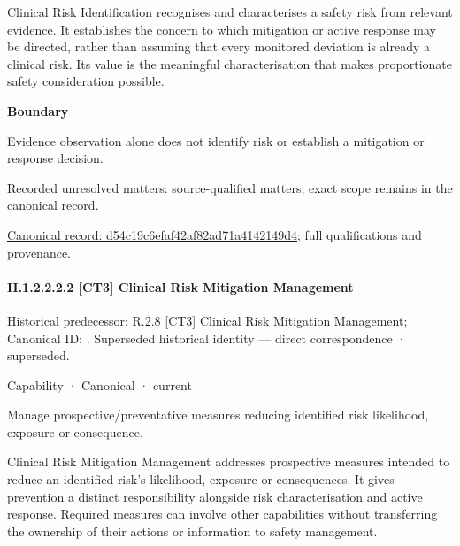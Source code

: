 Clinical Risk Identification recognises and characterises a safety risk from relevant evidence. It establishes the concern to which mitigation or active response may be directed, rather than assuming that every monitored deviation is already a clinical risk. Its value is the meaningful characterisation that makes proportionate safety consideration possible.



\textbf{Boundary}



Evidence observation alone does not identify risk or establish a mitigation or response decision.


{\small Recorded unresolved matters: source-qualified matters; exact scope remains in the canonical record.}\par
{\footnotesize \href{../../../../continuum/strategy/capability/d54c19c6efaf42af82ad71a4142149d4.md}{Canonical record: d54c19c6efaf42af82ad71a4142149d4}; full qualifications and provenance.}\par
\paragraph*{II.1.2.2.2.2 [CT3] Clinical Risk Mitigation Management}
\label{navigation:II.1.2.2.2.2}

{\small Historical predecessor: R.2.8 \hyperref[element:0bd3311d89af45bb935fde20e719369c]{[CT3] Clinical Risk Mitigation Management}; Canonical ID: \texttt{}. Superseded historical identity — direct correspondence · superseded.}\par
\label{element:2c232ade21ec45619c3ee4e928bd97ee}
{\small Capability · Canonical · current}\par

Manage prospective/preventative measures reducing identified risk likelihood, exposure or consequence.



Clinical Risk Mitigation Management addresses prospective measures intended to reduce an identified risk's likelihood, exposure or consequences. It gives prevention a distinct responsibility alongside risk characterisation and active response. Required measures can involve other capabilities without transferring the ownership of their actions or information to safety management.



